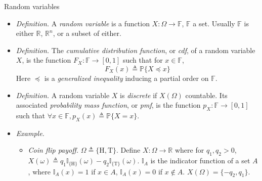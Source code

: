 \documentclass{beamer}
\numberwithin{equation}{section}
\begin{document}
\begin{frame}{Random variables}
    \begin{itemize}
        \item
        \textit{Definition.} A \textit{random variable} is a function
        $ X : \Omega \rightarrow \mathbb{F} $, $ \mathbb{F} $ a
        set\footnotemark{}. Usually $ \mathbb{F} $ is either $ \mathbb{R} $,
        $ \mathbb{R}^n $, or a subset of either.

        \item
        \textit{Definition.} The \textit{cumulative distribution function},
        or \textit{cdf}, of a random variable $ X $, is the function
        $ F_X : \mathbb{F} \rightarrow [0, 1] $ such that for
        $ x \in \mathbb{F} $,
        \begin{equation*}
            F_X(x) \triangleq \mathbb{P}\{X \preceq x\}
        \end{equation*}
        Here $ \preceq $ is a \textit{generalized inequality} inducing a
        partial order on $ \mathbb{F} $.

        \item
        \textit{Definition.} A random variable $ X $ is \textit{discrete} if
        $ X(\Omega) $ countable. Its associated \textit{probability mass
        function}, or \textit{pmf}, is the function
        $ p_X : \mathbb{F} \rightarrow [0, 1] $ such that
        $ \forall x \in \mathbb{F}, p_X(x) \triangleq \mathbb{P}\{X = x\} $.

        \item
        \textit{Example.}
        \begin{itemize}
            \item
            \textit{Coin flip payoff.} $ \Omega \triangleq \{\text{H},
            \text{T}\} $. Define $ X : \Omega \rightarrow \mathbb{R} $ where
            for $ q_1, q_2 > 0 $, $ X(\omega) \triangleq q_1
            \mathbb{I}_{\{\text{H}\}}(\omega) - 
            q_2\mathbb{I}_{\{\text{T}\}}(\omega) $. $ \mathbb{I}_A $ is the
            indicator function of a set $ A $, where $ \mathbb{I}_A(x) = 1 $
            if $ x \in A $, $ \mathbb{I}_A(x) = 0 $ if $ x \notin A $.
            $ X(\Omega) = \{-q_2, q_1\} $.
        \end{itemize}
    \end{itemize}

    \medskip

\end{frame}
\end{document}

